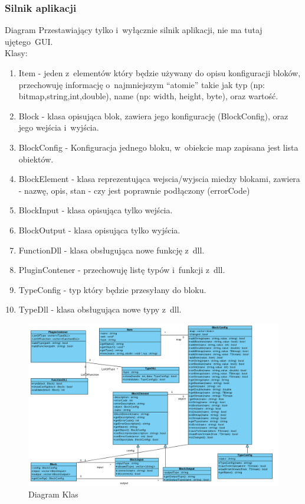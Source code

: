 \documentclass[a4paper,10pt]{article}
\begin{document}
\subsubsection{Silnik aplikacji}
Diagram Przestawiający tylko i~wyłącznie silnik aplikacji, nie ma tutaj ujętego~GUI.
\\
Klasy:
\begin{enumerate}
\item Item - jeden z~elementów który będzie używany do opisu konfiguracji bloków, przechowuję informację o~najmniejszym ``atomie'' takie jak typ 
(np: bitmap,string,int,double), name (np: width, height, byte), oraz wartość. 
\item Block - klasa opisująca blok, zawiera jego konfigurację (BlockConfig), oraz jego wejścia i~wyjścia.
\item BlockConfig - Konfiguracja jednego bloku, w~obiekcie map zapisana jest lista obiektów. 
\item BlockElement - klasa reprezentująca wejscia/wyjscia miedzy blokami, zawiera - nazwę, opis, stan - czy jest poprawnie podłączony (errorCode) 
\item BlockInput - klasa opisująca tylko wejścia.
\item BlockOutput - klasa opisująca tylko wyjścia.
\item FunctionDll - klasa obsługująca nowe funkcję z~dll.
\item PluginContener - przechowuję listę typów i~funkcji z~dll.
\item TypeConfig - typ który będzie przesyłany do bloku.
\item TypeDll - klasa obsługująca nowe typy z~dll.
\end{enumerate}

\begin{figure}[htbp]
\begin{center}
\includegraphics[angle=90,scale=0.5]{ClassDiagram}
\end{center}
\caption{Diagram Klas}
\label{fig:ClassDiagram}
\end{figure}
\newpage
\end{document}
